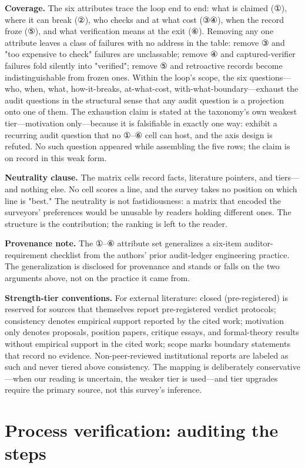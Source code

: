 \documentclass[11pt,a4paper]{article}
\begin{document}
\textbf{Coverage.} The six attributes trace the loop end to end: what is claimed (①), where it can break (②), who checks and at what cost (③④), when the record froze (⑤), and what verification means at the exit (⑥). Removing any one attribute leaves a class of failures with no address in the table: remove ③ and "too expensive to check" failures are unclassable; remove ④ and captured-verifier failures fold silently into "verified"; remove ⑤ and retroactive records become indistinguishable from frozen ones. Within the loop's scope, the six questions—who, when, what, how-it-breaks, at-what-cost, with-what-boundary—exhaust the audit questions in the structural sense that any audit question is a projection onto one of them. The exhaustion claim is stated at the taxonomy's own weakest tier—motivation only—because it is falsifiable in exactly one way: exhibit a recurring audit question that no ①–⑥ cell can host, and the axis design is refuted. No such question appeared while assembling the five rows; the claim is on record in this weak form.

\textbf{Neutrality clause.} The matrix cells record facts, literature pointers, and tiers—and nothing else. No cell scores a line, and the survey takes no position on which line is "best." The neutrality is not fastidiousness: a matrix that encoded the surveyors' preferences would be unusable by readers holding different ones. The structure is the contribution; the ranking is left to the reader.

\textbf{Provenance note.} The ①–⑥ attribute set generalizes a six-item auditor-requirement checklist from the authors' prior audit-ledger engineering practice. The generalization is disclosed for provenance and stands or falls on the two arguments above, not on the practice it came from.

\textbf{Strength-tier conventions.} For external literature: closed (pre-registered) is reserved for sources that themselves report pre-registered verdict protocols; consistency denotes empirical support reported by the cited work; motivation only denotes proposals, position papers, critique essays, and formal-theory results without empirical support in the cited work; scope marks boundary statements that record no evidence. Non-peer-reviewed institutional reports are labeled as such and never tiered above consistency. The mapping is deliberately conservative—when our reading is uncertain, the weaker tier is used—and tier upgrades require the primary source, not this survey's inference.

\section{Process verification: auditing the steps}
\end{document}
